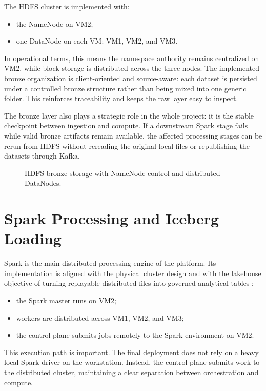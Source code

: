 The HDFS cluster is implemented with:
\begin{itemize}
    \item the NameNode on VM2;
    \item one DataNode on each VM: VM1, VM2, and VM3.
\end{itemize}

In operational terms, this means the namespace authority remains centralized on VM2, while block storage is distributed across the three nodes. The implemented bronze organization is client-oriented and source-aware: each dataset is persisted under a controlled bronze structure rather than being mixed into one generic folder. This reinforces traceability and keeps the raw layer easy to inspect.

The bronze layer also plays a strategic role in the whole project: it is the stable checkpoint between ingestion and compute. If a downstream Spark stage fails while valid bronze artifacts remain available, the affected processing stages can be rerun from HDFS without rereading the original local files or republishing the datasets through Kafka.

\begin{figure}[H]
    \centering
    
    \caption{HDFS bronze storage with NameNode control and distributed DataNodes.}
    \label{fig:chapter5-hdfs-bronze}
\end{figure}

\section{Spark Processing and Iceberg Loading}
Spark is the main distributed processing engine of the platform. Its implementation is aligned with the physical cluster design and with the lakehouse objective of turning replayable distributed files into governed analytical tables \cite{apache_spark_docs,apache_iceberg_docs,armbrust2021lakehouse}:
\begin{itemize}
    \item the Spark master runs on VM2;
    \item workers are distributed across VM1, VM2, and VM3;
    \item the control plane submits jobs remotely to the Spark environment on VM2.
\end{itemize}

This execution path is important. The final deployment does not rely on a heavy local Spark driver on the workstation. Instead, the control plane submits work to the distributed cluster, maintaining a clear separation between orchestration and compute.

